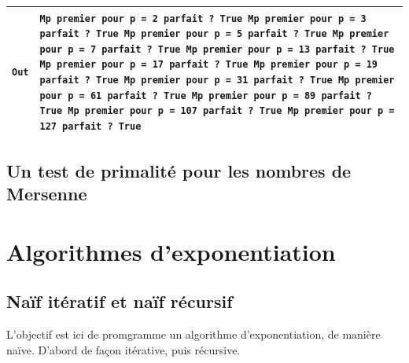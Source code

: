 \documentclass[titlepage]{article}
\begin{document}
    \begin{tabularx}{12cm}{|p{0.60cm}|X|}
        \hline
        \texttt{Out}
        &
        \texttt{Mp premier pour p = 2\newline
        parfait ? True\newline
        Mp premier pour p = 3\newline
        parfait ? True\newline
        Mp premier pour p = 5\newline
        parfait ? True\newline
        Mp premier pour p = 7\newline
        parfait ? True\newline
        Mp premier pour p = 13\newline
        parfait ? True\newline
        Mp premier pour p = 17\newline
        parfait ? True\newline
        Mp premier pour p = 19\newline
        parfait ? True\newline
        Mp premier pour p = 31\newline
        parfait ? True\newline
        Mp premier pour p = 61\newline
        parfait ? True\newline
        Mp premier pour p = 89\newline
        parfait ? True\newline
        Mp premier pour p = 107\newline
        parfait ? True\newline
        Mp premier pour p = 127\newline
        parfait ? True}
        \\
        \hline
    \end{tabularx}
    \bigbreak

    \subsection{Un test de primalité pour les nombres de Mersenne}

    \section{Algorithmes d'exponentiation}
    \subsection{Naïf itératif et naïf récursif}
    L'objectif est ici de promgramme un algorithme d'exponentiation, de manière naïve. D'abord de façon itérative, puis récursive.
\end{document}
